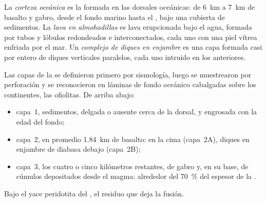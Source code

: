 \begin{definition}\label{def:b1:rifts-ridges-margins:oceanic-crust}
La \emph{corteza oceánica} es la  formada en las dorsales oceánicas: de \qty{6}{km} a \qty{7}{km} de basalto
y gabro, desde el fondo marino hasta el , bajo una cubierta de sedimentos. La \emph{lava en almohadillas} es
lava erupcionada bajo el agua, formada por tubos y lóbulos redondeados e interconectados, cada uno con una piel vítrea enfriada por el mar.
Un \emph{complejo de diques en enjambre} es una capa formada casi por entero de diques verticales
paralelos, cada uno intruido en los anteriores.
\end{definition}

Las capas de la  se definieron primero por sismología, luego se muestrearon por perforación y se reconocieron en láminas de
fondo oceánico cabalgadas sobre los continentes, las ofiolitas. De arriba abajo:
\begin{itemize}
  \item capa~1, sedimentos, delgada o ausente cerca de la dorsal, y engrosada con la
        edad del fondo;
  \item capa~2, en promedio \qty{1.84}{km} de basalto:  en la cima
        (capa~2A), diques en enjambre de diabasa debajo (capa~2B);
  \item capa~3, los cuatro o cinco kilómetros restantes, de gabro y, en su base, de cúmulos depositados desde el magma: alrededor del
        \qty{70}{\percent} del espesor de la .
\end{itemize}
Bajo el  yace peridotita del , el residuo que deja la fusión.

